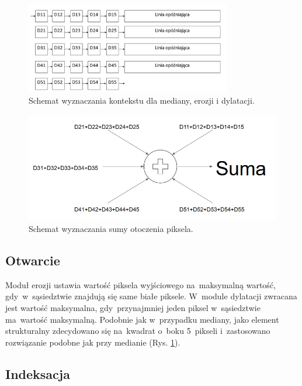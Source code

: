 \begin{figure}[h]
	\centering
	\includegraphics[width=0.8\textwidth]{kontekst.jpg}
	\caption{Schemat wyznaczania kontekstu dla mediany, erozji i dylatacji.}
	\label{fig:kontekst}
\end{figure}  

\begin{figure}[h]
	\centering
	\includegraphics[width=\textwidth]{drzewo_sumacyjne.jpg}
	\caption{Schemat wyznaczania sumy otoczenia piksela.}
	\label{fig:drzewo_sumacyjne}
\end{figure}  

\subsection{Otwarcie}
\label{subsec:erozja}

Moduł erozji ustawia wartość piksela wyjściowego na~maksymalną wartość, gdy~w~sąsiedztwie znajdują się same białe piksele. 
W~module dylatacji zwracana jest wartość maksymalna, gdy~przynajmniej jeden piksel w~sąsiedztwie ma~wartość maksymalną.
Podobnie jak w~przypadku mediany, jako element strukturalny zdecydowano się na~kwadrat o~boku 5~pikseli i~zastosowano rozwiązanie podobne jak przy medianie (Rys. \ref{fig:kontekst}).

\subsection{Indeksacja}
\label{subsec:indeksacja}

